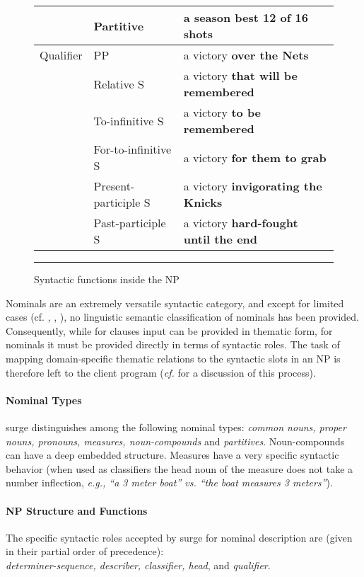 \begin{figure*} [t]
\begin{tabular}{|l|l|l|}
& Partitive & a season best {\bf 12 of 16 shots}\\\hline
Qualifier & PP & a victory {\bf over the Nets}\\\cline{2-3}
& Relative S & a victory {\bf that will be remembered}\\\cline{2-3}
& To-infinitive S & a victory {\bf to be remembered}\\\cline{2-3}
& For-to-infinitive S & a victory {\bf for them to grab}\\\cline{2-3}
& Present-participle S & a victory {\bf invigorating the Knicks}\\\cline{2-3}  
& Past-participle S & a victory {\bf hard-fought until the end}\\\hline
\end{tabular}
\caption{Syntactic functions inside the NP}
\label{synt-fcts-in-NP}
\rule{\textwidth}{.01in}
\end{figure*}

Nominals are an extremely versatile syntactic category, and except for
limited cases (cf. \cite{vendler}, \cite{levi}, \cite{fries}), no
linguistic semantic classification of nominals has been provided.
Consequently, while for clauses input can be provided in thematic form, for
nominals it must be provided directly in terms of syntactic roles.  The
task of mapping domain-specific thematic relations to the syntactic slots
in an NP is therefore left to the client program ({\em cf.}
\cite{elhadad-mt} for a discussion of this process).

\paragraph{Nominal Types}

{\sc surge} distinguishes among the following nominal types: {\em common
  nouns, proper nouns, pronouns, measures, noun-compounds} and {\em
  partitives}.  Noun-compounds can have a deep embedded structure.
Measures have a very specific syntactic behavior (when used as classifiers
the head noun of the measure does not take a number inflection, {\em e.g.,
  ``a 3 meter boat'' vs. ``the boat measures 3 meters''}).

\paragraph{NP Structure and Functions}

The specific syntactic roles accepted by {\sc surge} for nominal
description are (given in their partial order of precedence):\\ {\em
  determiner-sequence, describer, classifier, head}, and {\em qualifier}.


